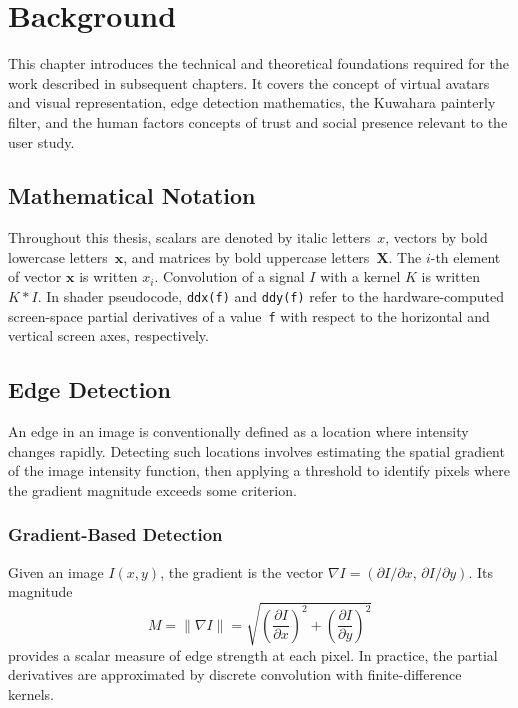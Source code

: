 \chapter{Background}
\label{ch:background}

This chapter introduces the technical and theoretical foundations required for the work described in subsequent chapters. It covers the concept of virtual avatars and visual representation, edge detection mathematics, the Kuwahara painterly filter, and the human factors concepts of trust and social presence relevant to the user study.

\section{Mathematical Notation}
\label{sec:notation}

Throughout this thesis, scalars are denoted by italic letters~$x$, vectors by bold lowercase letters~$\mathbf{x}$, and matrices by bold uppercase letters~$\mathbf{X}$. The $i$-th element of vector $\mathbf{x}$ is written $x_i$. Convolution of a signal $I$ with a kernel $K$ is written $K * I$. In shader pseudocode, \texttt{ddx(f)} and \texttt{ddy(f)} refer to the hardware-computed screen-space partial derivatives of a value~\texttt{f} with respect to the horizontal and vertical screen axes, respectively.

\section{Edge Detection}
\label{sec:background_edge}

An edge in an image is conventionally defined as a location where intensity changes rapidly. Detecting such locations involves estimating the spatial gradient of the image intensity function, then applying a threshold to identify pixels where the gradient magnitude exceeds some criterion.

\subsection{Gradient-Based Detection}
\label{sec:background_gradient}

Given an image $I(x, y)$, the gradient is the vector $\nabla I = (\partial I / \partial x, \, \partial I / \partial y)$. Its magnitude
\begin{equation}
  M = \|\nabla I\| = \sqrt{\left(\frac{\partial I}{\partial x}\right)^2 + \left(\frac{\partial I}{\partial y}\right)^2}
  \label{eq:gradient_magnitude}
\end{equation}
provides a scalar measure of edge strength at each pixel. In practice, the partial derivatives are approximated by discrete convolution with finite-difference kernels.

